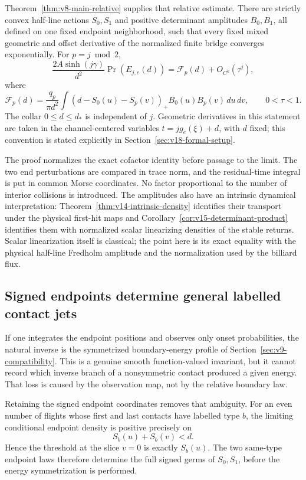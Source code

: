 Theorem~\ref{thm:v8-main-relative} supplies that relative estimate.  There
are strictly convex half-line actions $S_0,S_1$ and positive determinant
amplitudes $B_0,B_1$, all defined on one fixed endpoint neighborhood, such
that every fixed mixed geometric and offset derivative of the normalized
finite bridge converges exponentially.  For $p=j\bmod2$,
\begin{equation}\label{eq:v19-intro-relative-law}
 \frac{2A\sinh(j\gamma)}{d^2}\Pr(E_{j,e}(d))
 =\mathcal F_p(d)+O_{C^k}(\tau^j),
\end{equation}
where
\begin{equation}\label{eq:v19-intro-limit-law}
 \mathcal F_p(d)=\frac{q_p}{\pi d^2}
 \int(d-S_0(u)-S_p(v))_+B_0(u)B_p(v)\,du\,dv,
 \qquad 0<\tau<1.
\end{equation}
The collar $0\le d\le d_*$ is independent of $j$.  Geometric derivatives
in this statement are taken in the channel-centered variables
$t=jg_e(\xi)+d$, with $d$ fixed; this convention is stated explicitly in
Section~\ref{sec:v18-formal-setup}.

The proof normalizes the exact cofactor identity before passage to the
limit.  The two end perturbations are compared in trace norm, and the
residual-time integral is put in common Morse coordinates.  No factor
proportional to the number of interior collisions is introduced.  The
amplitudes also have an intrinsic dynamical interpretation:
Theorem~\ref{thm:v14-intrinsic-density} identifies their transport under the
physical first-hit maps and Corollary~\ref{cor:v15-determinant-product}
identifies them with normalized scalar linearizing densities of the stable
returns.  Scalar linearization itself is classical; the point here is its
exact equality with the physical half-line Fredholm amplitude and the
normalization used by the billiard flux.

\subsection{Signed endpoints determine general labelled contact jets}
If one integrates the endpoint positions and observes only onset
probabilities, the natural inverse is the symmetrized boundary-energy
profile of Section~\ref{sec:v9-compatibility}.  This is a genuine smooth
function-valued invariant, but it cannot record which inverse branch of a
nonsymmetric contact produced a given energy.  That loss is caused by the
observation map, not by the relative boundary law.

Retaining the signed endpoint coordinates removes that ambiguity.  For an
even number of flights whose first and last contacts have labelled type
$b$, the limiting conditional endpoint density is positive precisely on
\begin{equation}\label{eq:v19-intro-endpoint-support}
             S_b(u)+S_b(v)<d.
\end{equation}
Hence the threshold at the slice $v=0$ is exactly $S_b(u)$.  The two
same-type endpoint laws therefore determine the full signed germs of
$S_0,S_1$, before the energy symmetrization is performed.


